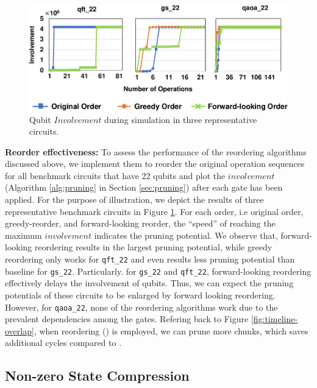 \begin{figure}[h!]
\includegraphics[width=\textwidth]{Images/appendix2/section-4/involvement.pdf}
\centering
\caption{Qubit $Involvement$ during simulation in three representative circuits.}%
\label{fig-inv}
\vspace{-5pt}
\end{figure}

\noindent \textbf{Reorder effectiveness:}
To assess the performance of the reordering algorithms discussed above, we implement them to reorder the original operation sequences for all benchmark circuits that have 22 qubits and plot the $involvement$ (Algorithm \ref{alg:pruning} in Section \ref{sec:pruning}) after each gate has been applied. For the purpose of illustration, we depict the results of three representative benchmark circuits in Figure \ref{fig-inv}. 
For each order, i.e original order, greedy-reorder, and forward-looking reorder, the ``speed'' of reaching the maximum $involvement$ indicates the pruning potential. 
We observe that, forward-looking reordering results in the largest pruning potential, while greedy reordering only works for {\tt qft\_22} and even results less pruning potential than baseline for {\tt gs\_22}. Particularly. for {\tt gs\_22} and {\tt qft\_22}, forward-looking reordering effectively delays the involvement of qubits. Thus, we can expect the pruning potentials of these circuits to be enlarged by forward looking reordering. However, for {\tt qaoa\_22}, none of the reordering algorithms work due to the prevalent dependencies among the gates. Refering back to Figure \ref{fig:timeline-overlap}, when reordering () is employed, we can prune more chunks, which saves additional  cycles compared to .  

\subsection{Non-zero State Compression}
\label{sec:compress}

